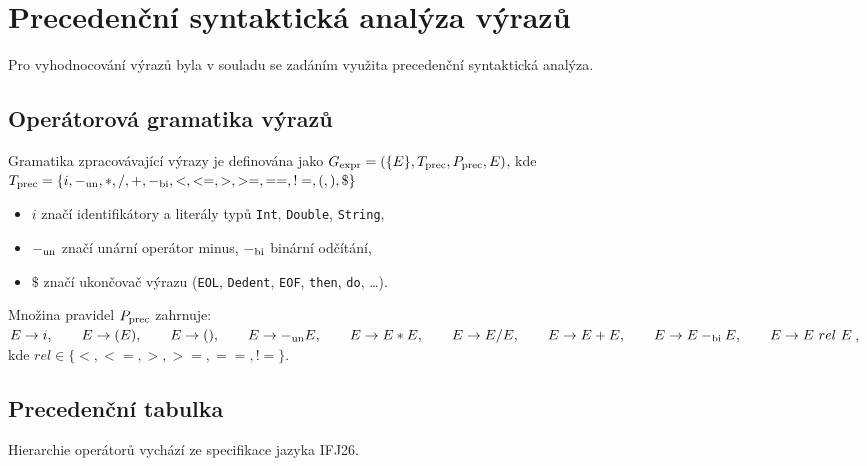 \documentclass[a4paper, 11pt]{article}
\begin{document}
\vspace*{\fill}

\clearpage


\section{Precedenční syntaktická analýza výrazů}

Pro vyhodnocování výrazů byla v souladu se zadáním využita precedenční syntaktická analýza.

\subsection{Operátorová gramatika výrazů}

Gramatika zpracovávající výrazy je definována jako
$G_{\textnormal{expr}} = (\{E\}, T_{\textnormal{prec}}, P_{\textnormal{prec}}, E)$,
kde $T_{\textnormal{prec}} = \{ i, -_{\textnormal{un}}, \\ *, /, +, -_{\textnormal{bi}},
<, <=, >, >=, ==, !=, (, ), \$ \}$

\begin{itemize}
    \item $i$ značí identifikátory a literály typů \texttt{Int}, \texttt{Double}, \texttt{String},
    \item $-_{\textnormal{un}}$ značí unární operátor minus, $-_{\textnormal{bi}}$ binární odčítání,
    \item $\$$ značí ukončovač výrazu (\texttt{EOL}, \texttt{Dedent}, \texttt{EOF}, \texttt{then}, \texttt{do}, \dots).
\end{itemize}

\noindent Množina pravidel $P_{\textnormal{prec}}$ zahrnuje: \quad $E \rightarrow i, \qquad E \rightarrow (E),
\qquad E \rightarrow (), \qquad E \rightarrow -_{\textnormal{un}}E, \qquad E \rightarrow E * E,
\qquad E \rightarrow E / E, \qquad E \rightarrow E + E, \qquad E \rightarrow E -_{\textnormal{bi}} E,
\qquad E \rightarrow E \ rel \ E$, kde $rel \in \{ <, <=, >, >=, ==, != \}.$

\subsection{Precedenční tabulka}
Hierarchie operátorů vychází ze specifikace jazyka IFJ26.
\end{document}
